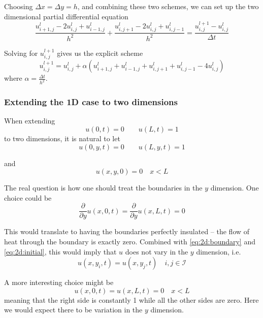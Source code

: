 \documentclass[10pt,a4paper]{article}
\newcommand{\indexset}{\mathcal{I}}
\newcommand{\dt}{{\Delta t}}
\newcommand{\dx}{{\Delta x}}
\newcommand{\dy}{{\Delta y}}
\newcommand{\fracpy}{\frac{\partial}{\partial y}}
\begin{document}
Choosing $\dx = \dy = h$, and combining these two schemes, we can set up the two dimensional partial differential equation
\begin{equation}
\frac{u_{i+1,j}^l - 2u_{i,j}^l + u_{i-1,j}^l}{h^2} + \frac{u_{i,j+1}^l - 2u_{i,j}^l + u_{i,j-1}^l}{h^2} = \frac{u_{i,j}^{l+1} - u_{i,j}^l}{\dt}
\end{equation}

Solving for $u_{i,j}^{l+1}$ gives us the explicit scheme
\begin{equation}
u_{i,j}^{l+1} = u_{i,j}^l + \alpha\left( u_{i+1,j}^l + u_{i-1,j}^l + u_{i,j+1}^l + u_{i,j-1}^l - 4u_{i,j}^l \right)
\end{equation}
where $\alpha = \frac{\dt}{h^2}$.

\subsubsection{Extending the 1D case to two dimensions}
When extending
\begin{equation}
u(0,t) = 0 \quad \quad u(L,t) = 1
\end{equation}
to two dimensions, it is natural to let
\begin{equation}
\label{eq:2d:boundary}
u(0,y,t) = 0 \quad \quad u(L,y,t) = 1
\end{equation}

and
\begin{equation}
\label{eq:2d:initial}
u(x,y,0) = 0 \quad x < L
\end{equation}


The real question is how one should treat the boundaries in the $y$ dimension.
One choice could be
\begin{equation}
\label{eq:2d:boundary:neumann}
\fracpy u(x,0,t) = \fracpy u(x,L,t) = 0
\end{equation}

This would translate to having the boundaries perfectly insulated -- the flow of heat through the boundary is exactly zero. Combined with \ref{eq:2d:boundary} and \ref{eq:2d:initial}, this would imply that $u$ does not vary in the $y$ dimension, i.e.
\begin{equation}
u(x,y_i,t) = u(x,y_j,t) \quad i, j \in \indexset
\end{equation}

A more interesting choice might be
\begin{equation}
\label{eq:2d:boundary:dirichlet}
u(x,0,t)=u(x,L,t)=0 \quad x < L
\end{equation}
meaning that the right side is constantly 1 while all the other sides are zero. Here we would expect there to be variation in the $y$ dimension.
\end{document}
